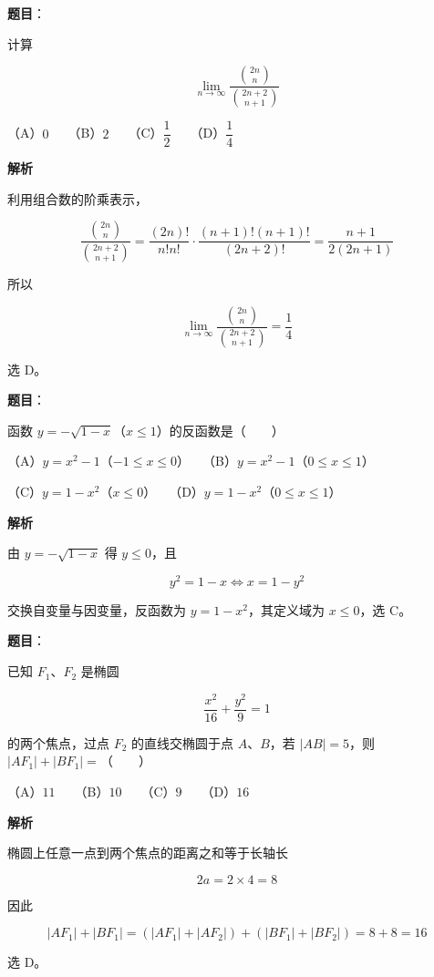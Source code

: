 \begin{answer}

\textbf{题目}：

计算

\nopagebreak[4]
\[
\lim_{n\to\infty}\frac{\binom{2n}{n}}{\binom{2n+2}{n+1}}
\]

（A）$0$　　（B）$2$　　（C）$\dfrac12$　　（D）$\dfrac14$

\textbf{解析}

利用组合数的阶乘表示，

\nopagebreak[4]
\[
\frac{\binom{2n}{n}}{\binom{2n+2}{n+1}}
=\frac{(2n)!}{n!n!}\cdot\frac{(n+1)!(n+1)!}{(2n+2)!}
=\frac{n+1}{2(2n+1)}
\]

所以

\nopagebreak[4]
\[
\lim_{n\to\infty}\frac{\binom{2n}{n}}{\binom{2n+2}{n+1}}=\frac14
\]

选 D。


\end{answer}
\begin{answer}

\textbf{题目}：

函数 $y=-\sqrt{1-x}$（$x\le1$）的反函数是\mbox{（　　）}

（A）$y=x^2-1$（$-1\le x\le0$）　　（B）$y=x^2-1$（$0\le x\le1$）

（C）$y=1-x^2$（$x\le0$）　　（D）$y=1-x^2$（$0\le x\le1$）

\textbf{解析}

由 $y=-\sqrt{1-x}$ 得 $y\le0$，且

\nopagebreak[4]
\[
y^2=1-x
\Longleftrightarrow
x=1-y^2
\]

交换自变量与因变量，反函数为 $y=1-x^2$，其定义域为 $x\le0$，选 C。


\end{answer}
\begin{answer}

\textbf{题目}：

已知 $F_1\text{、}F_2$ 是椭圆

\nopagebreak[4]
\[
\frac{x^2}{16}+\frac{y^2}{9}=1
\]

的两个焦点，过点 $F_2$ 的直线交椭圆于点 $A\text{、}B$，若 $|AB|=5$，则 $|AF_1|+|BF_1|=$\mbox{（　　）}

（A）$11$　　（B）$10$　　（C）$9$　　（D）$16$

\textbf{解析}

椭圆上任意一点到两个焦点的距离之和等于长轴长

\nopagebreak[4]
\[
2a=2\times4=8
\]

因此

\nopagebreak[4]
\[
|AF_1|+|BF_1|=(|AF_1|+|AF_2|)+(|BF_1|+|BF_2|)=8+8=16
\]

选 D。


\end{answer}

